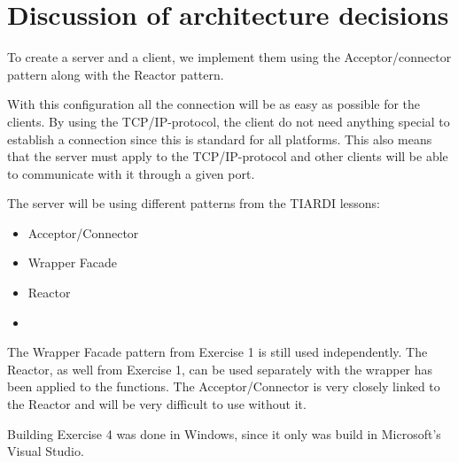 \documentclass[Main]{subfiles}
\begin{document}
\section{Discussion of architecture decisions}

To create a server and a client, we implement them using the Acceptor/connector pattern along with the Reactor pattern.

With this configuration all the connection will be as easy as possible for the clients.
By using the TCP/IP-protocol, the client do not need anything special to establish a connection since this is standard for all platforms.
This also means that the server must apply to the TCP/IP-protocol and other clients will be able to communicate with it through a given port.


The server will be using different patterns from the TIARDI lessons:
\begin{itemize}
	\item Acceptor/Connector
	\item Wrapper Facade
	\item Reactor
	\item {}
\end{itemize}

The Wrapper Facade pattern from Exercise 1 is still used independently.
The Reactor, as well from Exercise 1, can be used separately with the wrapper has been applied to the functions. 
The Acceptor/Connector is very closely linked to the Reactor and will be very difficult to use without it.


Building Exercise 4 was done in Windows, since it only was build in Microsoft's Visual Studio.	
\end{document}
